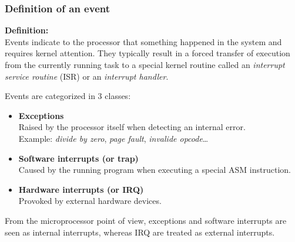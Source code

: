 \begin{frame}
  \frametitle{Definition of an event}

  {\bf Definition:}\\
  Events indicate to the processor that something happened in the system
  and requires kernel attention. They typically result in a forced transfer of
  execution from the currently running task to a special kernel routine  called
  an {\em interrupt service routine} (ISR) or an {\em interrupt handler}.\\

  \nl

  Events are categorized in 3 classes:

  \begin{itemize}
    \item {\bf Exceptions}\\
      Raised by the processor itself when detecting an internal error.\\
      Example: {\em divide by zero}, {\em page fault}, {\em invalide opcode}\ldots
    \item {\bf Software interrupts (or trap)}\\
      Caused by the running program when executing a special ASM instruction.
    \item {\bf Hardware interrupts (or IRQ)}\\
      Provoked by external hardware devices.
  \end{itemize}

  \nl

  From the microprocessor point of view, exceptions and software interrupts are
  seen as internal interrupts, whereas IRQ are treated as external interrupts.

\end{frame}

%
%
%

